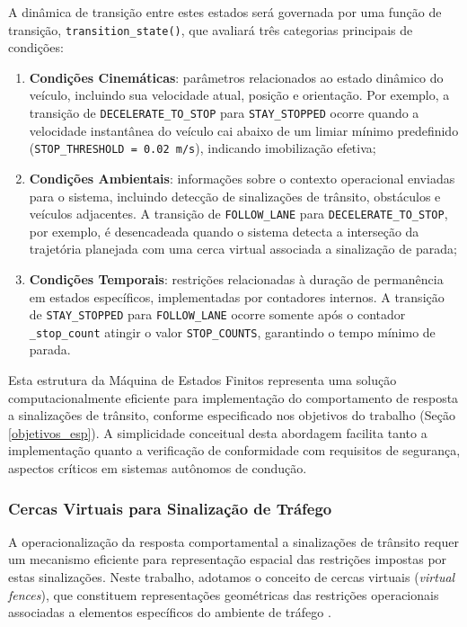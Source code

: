 A dinâmica de transição entre estes estados será governada por uma função de transição, \texttt{transition\_state()}, que avaliará três categorias principais de condições:

\begin{enumerate}
    \item \textbf{Condições Cinemáticas}: parâmetros relacionados ao estado dinâmico do veículo, incluindo sua velocidade atual, posição e orientação. Por exemplo, a transição de \texttt{DECELERATE\_TO\_STOP} para \texttt{STAY\_STOPPED} ocorre quando a velocidade instantânea do veículo cai abaixo de um limiar mínimo predefinido (\texttt{STOP\_THRESHOLD = 0.02 m/s}), indicando imobilização efetiva;
    
    \item \textbf{Condições Ambientais}: informações sobre o contexto operacional enviadas para o sistema, incluindo detecção de sinalizações de trânsito, obstáculos e veículos adjacentes. A transição de \texttt{FOLLOW\_LANE} para \texttt{DECELERATE\_TO\_STOP}, por exemplo, é desencadeada quando o sistema detecta a interseção da trajetória planejada com uma cerca virtual associada a sinalização de parada;
    
    \item \textbf{Condições Temporais}: restrições relacionadas à duração de permanência em estados específicos, implementadas por contadores internos. A transição de \texttt{STAY\_STOPPED} para \texttt{FOLLOW\_LANE} ocorre somente após o contador \texttt{\_stop\_count} atingir o valor \texttt{STOP\_COUNTS}, garantindo o tempo mínimo de parada.
\end{enumerate}

Esta estrutura da Máquina de Estados Finitos representa uma solução computacionalmente eficiente para implementação do comportamento de resposta a sinalizações de trânsito, conforme especificado nos objetivos do trabalho (Seção \ref{objetivos_esp}). A simplicidade conceitual desta abordagem facilita tanto a implementação quanto a verificação de conformidade com requisitos de segurança, aspectos críticos em sistemas autônomos de condução.

\subsubsection{Cercas Virtuais para Sinalização de Tráfego} \label{subsubsec:cercas_virtuais}

A operacionalização da resposta comportamental a sinalizações de trânsito requer um mecanismo eficiente para representação espacial das restrições impostas por estas sinalizações. Neste trabalho, adotamos o conceito de cercas virtuais (\textit{virtual fences}), que constituem representações geométricas das restrições operacionais associadas a elementos específicos do ambiente de tráfego \cite{wei2014behavioral}.

